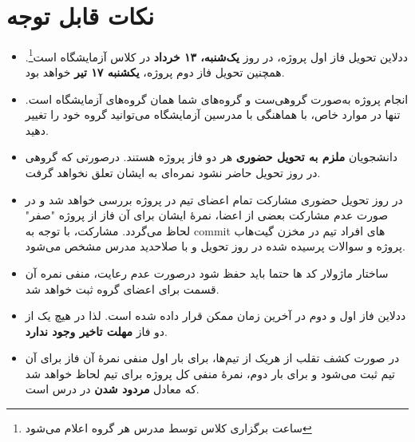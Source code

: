 \documentclass[]{article}
\begin{document}
\newpage
\pagestyle{fancy}
\fancyhf{}
\fancyfoot{}
\cfoot{\thepage}
\renewcommand{\headrulewidth}{2pt}



\tableofcontents

\newpage

 \Large \textbf{\\
}

\section*{{\titr نکات قابل توجه}}
\begin{itemize}
	
\item 
ددلاین تحویل فاز اول پروژه، در روز‌ \textbf{یک‌شنبه، ۱۳ خرداد} در کلاس آزمایشگاه است\footnote{ساعت برگزاری کلاس توسط مدرس هر گروه اعلام می‌شود}. همچنین تحویل فاز دوم پروژه، \textbf{یکشنبه ۱۷ تیر} خواهد بود.
	
\item
انجام پروژه به‌صورت گروهی‌ست و گروه‌های شما همان گروه‌های آزمایشگاه است. تنها در موارد خاص، با هماهنگی با مدرسین آزمایشگاه می‌توانید گروه خود را تغییر دهید.


\item
دانشجویان \textbf{ملزم به تحویل حضوری} هر دو فاز پروژه هستند. درصورتی که گروهی در روز تحویل حاضر نشود نمره‌ای به ایشان تعلق نخواهد گرفت.

\item
در روز تحویل حضوری مشارکت تمام اعضای تیم در پروژه بررسی خواهد‌ شد و در صورت عدم مشارکت بعضی از اعضا، نمرهٔ ایشان برای آن فاز از پروژه "صفر" لحاظ می‌گردد. مشارکت، با توجه به commit های افراد تیم در مخزن گیت‌هاب پروژه و سوالات پرسیده شده در روز تحویل و با صلاحدید مدرس مشخص می‌شود.

\item 
ساختار ماژولار کد ها حتما باید حفظ شود درصورت عدم رعایت، منفی نمره آن قسمت برای اعضای گروه ثبت خواهد شد.

\item
ددلاین فاز اول و دوم در آخرین زمان ممکن قرار داده شده است. لذا در هیچ یک از دو فاز \textbf{مهلت تاخیر وجود ندارد}.

\item
در صورت کشف تقلب از هریک از تیم‌ها، برای بار اول منفی نمرهٔ آن فاز برای آن تیم ثبت می‌شود و برای بار دوم، نمرهٔ منفی کل پروژه برای تیم لحاظ خواهد‌ شد که معادل \textbf{مردود شدن} در درس است.
\end{itemize}
\end{document}
